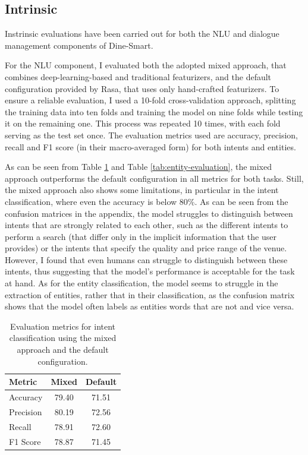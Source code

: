 \documentclass[twocolumn]{article}
\begin{document}
\subsection{Intrinsic}

Instrinsic evaluations have been carried out for both the NLU and dialogue management components of Dine-Smart.

For the NLU component, I evaluated both the adopted mixed approach, that combines deep-learning-based and traditional featurizers, and the default configuration provided by Rasa, that uses only hand-crafted featurizers. To ensure a reliable evaluation, I used a 10-fold cross-validation approach, splitting the training data into ten folds and training the model on nine folds while testing it on the remaining one. This process was repeated 10 times, with each fold serving as the test set once. The evaluation metrics used are accuracy, precision, recall and F1 score (in their macro-averaged form) for both intents and entities.

As can be seen from Table \ref{tab:intent-evaluation} and Table \ref{tab:entity-evaluation}, the mixed approach outperforms the default configuration in all metrics for both tasks. Still, the mixed approach also shows some limitations, in particular in the intent classification, where even the accuracy is below 80\%. As can be seen from the confusion matrices in the appendix, the model struggles to distinguish between intents that are strongly related to each other, such as the different intents to perform a search (that differ only in the implicit information that the user provides) or the intents that specify the quality and price range of the venue. However, I found that even humans can struggle to distinguish between these intents, thus suggesting that the model's performance is acceptable for the task at hand. As for the entity classification, the model seems to struggle in the extraction of entities, rather that in their classification, as the confusion matrix shows that the model often labels as entities words that are not and vice versa.

\begin{table}[ht]
    \centering
    \begin{tabular}{lcc}
        \toprule
        \textbf{Metric} & \textbf{Mixed} & \textbf{Default} \\
        \midrule
        Accuracy        & 79.40          & 71.51            \\
        Precision       & 80.19          & 72.56            \\
        Recall          & 78.91          & 72.60            \\
        F1 Score        & 78.87          & 71.45            \\
        \bottomrule
    \end{tabular}
    \captionsetup{margin=0.5cm}
    \caption{Evaluation metrics for intent classification using the mixed approach and the default configuration.}
    \label{tab:intent-evaluation}
\end{table}
\end{document}
